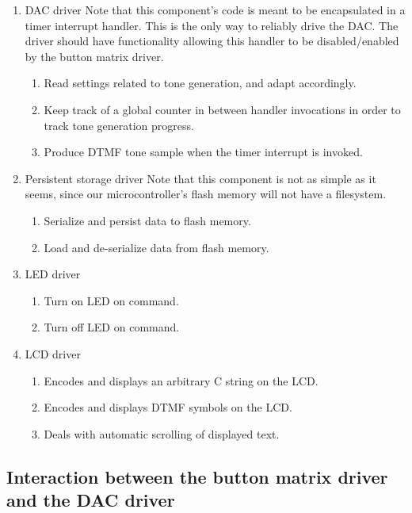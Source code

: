 \documentclass[11pt,a4paper
]{scrartcl}
\begin{document}
\begin{enumerate}
   \item DAC driver
      Note that this component's code is meant to be encapsulated in a timer interrupt handler.
      This is the only way to reliably drive the DAC.
      The driver should have functionality allowing this handler to be disabled/enabled by the button matrix driver.
      \begin{enumerate}
         \item Read settings related to tone generation, and adapt accordingly.
         \item Keep track of a global counter in between handler invocations in order to track tone generation progress.
         \item Produce DTMF tone sample when the timer interrupt is invoked.
      \end{enumerate}

   \item Persistent storage driver
      Note that this component is not as simple as it seems, since our microcontroller's flash memory will not have a filesystem.
      \begin{enumerate}
         \item Serialize and persist data to flash memory.
         \item Load and de-serialize data from flash memory.
      \end{enumerate}
   
   \item LED driver
      \begin{enumerate}
         \item Turn on LED on command.
         \item Turn off LED on command.
      \end{enumerate}

   \item LCD driver
      \begin{enumerate}
         \item Encodes and displays an arbitrary C string on the LCD.
         \item Encodes and displays DTMF symbols on the LCD.
         \item Deals with automatic scrolling of displayed text.
      \end{enumerate}
\end{enumerate}

\subsection{Interaction between the button matrix driver and the DAC driver}
\end{document}
